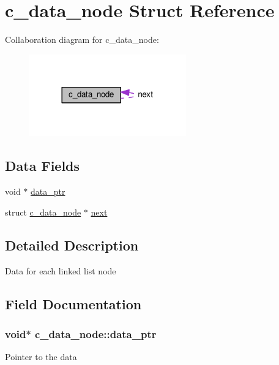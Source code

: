 \hypertarget{structc__data__node}{}\section{c\+\_\+data\+\_\+node Struct Reference}
\label{structc__data__node}


Collaboration diagram for c\+\_\+data\+\_\+node\+:\nopagebreak
\begin{figure}[H]
\begin{center}
\leavevmode
\includegraphics[width=192pt]{d6/ddc/structc__data__node__coll__graph}
\end{center}
\end{figure}
\subsection*{Data Fields}
\begin{DoxyCompactItemize}
\item 
void $\ast$ \hyperlink{structc__data__node_aa58b429814d87780d55f6affc90b400f}{data\+\_\+ptr}
\item 
struct \hyperlink{structc__data__node}{c\+\_\+data\+\_\+node} $\ast$ \hyperlink{structc__data__node_aaa2bf8d750ad19558b6514499b8a2420}{next}
\end{DoxyCompactItemize}


\subsection{Detailed Description}
Data for each linked list node 

\subsection{Field Documentation}
\subsubsection[{\texorpdfstring{data\+\_\+ptr}{data_ptr}}]{\setlength{\rightskip}{0pt plus 5cm}void$\ast$ c\+\_\+data\+\_\+node\+::data\+\_\+ptr}\hypertarget{structc__data__node_aa58b429814d87780d55f6affc90b400f}{}\label{structc__data__node_aa58b429814d87780d55f6affc90b400f}
Pointer to the data 
